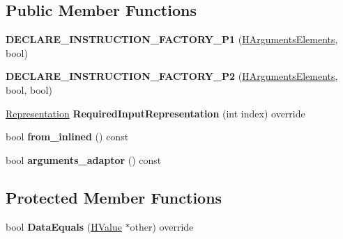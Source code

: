 \subsection*{Public Member Functions}
\begin{DoxyCompactItemize}
\item 
{\bfseries D\+E\+C\+L\+A\+R\+E\+\_\+\+I\+N\+S\+T\+R\+U\+C\+T\+I\+O\+N\+\_\+\+F\+A\+C\+T\+O\+R\+Y\+\_\+\+P1} (\hyperlink{classv8_1_1internal_1_1_h_arguments_elements}{H\+Arguments\+Elements}, bool)\hypertarget{classv8_1_1internal_1_1_h_arguments_elements_a16f882cb8405a9bbf5ccb006dc3ee722}{}\label{classv8_1_1internal_1_1_h_arguments_elements_a16f882cb8405a9bbf5ccb006dc3ee722}

\item 
{\bfseries D\+E\+C\+L\+A\+R\+E\+\_\+\+I\+N\+S\+T\+R\+U\+C\+T\+I\+O\+N\+\_\+\+F\+A\+C\+T\+O\+R\+Y\+\_\+\+P2} (\hyperlink{classv8_1_1internal_1_1_h_arguments_elements}{H\+Arguments\+Elements}, bool, bool)\hypertarget{classv8_1_1internal_1_1_h_arguments_elements_a5bf525442b76dddd405915288a36db4b}{}\label{classv8_1_1internal_1_1_h_arguments_elements_a5bf525442b76dddd405915288a36db4b}

\item 
\hyperlink{classv8_1_1internal_1_1_representation}{Representation} {\bfseries Required\+Input\+Representation} (int index) override\hypertarget{classv8_1_1internal_1_1_h_arguments_elements_ac9679066c680e826d0925c13dd4559e5}{}\label{classv8_1_1internal_1_1_h_arguments_elements_ac9679066c680e826d0925c13dd4559e5}

\item 
bool {\bfseries from\+\_\+inlined} () const \hypertarget{classv8_1_1internal_1_1_h_arguments_elements_af0fbacdaca06ce6b9072e0cb7985f433}{}\label{classv8_1_1internal_1_1_h_arguments_elements_af0fbacdaca06ce6b9072e0cb7985f433}

\item 
bool {\bfseries arguments\+\_\+adaptor} () const \hypertarget{classv8_1_1internal_1_1_h_arguments_elements_a6beff64422df4f091df0ed80a33c2be9}{}\label{classv8_1_1internal_1_1_h_arguments_elements_a6beff64422df4f091df0ed80a33c2be9}

\end{DoxyCompactItemize}
\subsection*{Protected Member Functions}
\begin{DoxyCompactItemize}
\item 
bool {\bfseries Data\+Equals} (\hyperlink{classv8_1_1internal_1_1_h_value}{H\+Value} $\ast$other) override\hypertarget{classv8_1_1internal_1_1_h_arguments_elements_a341f2db5dbd83322b900828d60023889}{}\label{classv8_1_1internal_1_1_h_arguments_elements_a341f2db5dbd83322b900828d60023889}

\end{DoxyCompactItemize}
